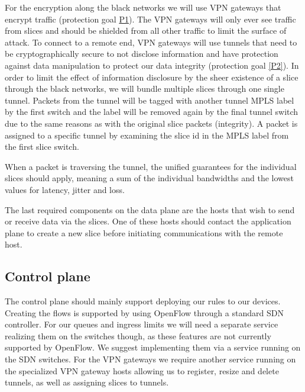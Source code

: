 For the encryption along the black networks we will use VPN gateways that encrypt traffic (protection goal \hyperref[P1]{P1}). The VPN gateways will only ever see traffic from slices and should be shielded from all other traffic to limit the surface of attack. To connect to a remote end, VPN gateways will use tunnels that need to be cryptographically secure to not disclose information and have protection against data manipulation to protect our data integrity (protection goal \ref{P2}). In order to limit the effect of information disclosure by the sheer existence of a slice through the black networks, we will bundle multiple slices through one single tunnel. Packets from the tunnel will be tagged with another tunnel MPLS label by the first switch and the label will be removed again by the final tunnel switch due to the same reasons as with the original slice packets (integrity). A packet is assigned to a specific tunnel by examining the slice id in the MPLS label from the first slice switch.


When a packet is traversing the tunnel, the unified guarantees for the individual slices should apply, meaning a sum of the individual bandwidths and the lowest values for latency, jitter and loss.


The last required components on the data plane are the hosts that wish to send or receive data via the slices. One of these hosts should contact the application plane to create a new slice before initiating communications with the remote host.


\subsection{Control plane}
The control plane should mainly support deploying our rules to our devices. Creating the flows is supported by using OpenFlow through a standard SDN controller. For our queues and ingress limits we will need a separate service realizing them on the switches though, as these features are not currently supported by OpenFlow. We suggest implementing them via a service running on the SDN switches. For the VPN gateways we require another service running on the specialized VPN gateway hosts allowing us to register, resize and delete tunnels, as well as assigning slices to tunnels.

